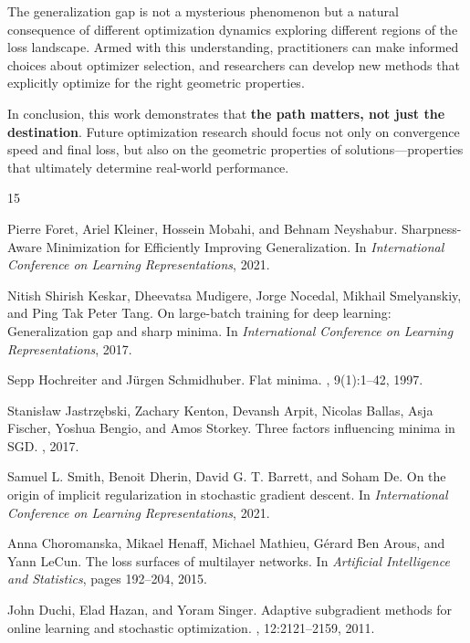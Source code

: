 \documentclass[12pt,a4paper]{article}
\begin{document}
The generalization gap is not a mysterious phenomenon but a natural consequence of different optimization dynamics exploring different regions of the loss landscape. Armed with this understanding, practitioners can make informed choices about optimizer selection, and researchers can develop new methods that explicitly optimize for the right geometric properties.

In conclusion, this work demonstrates that \textbf{the path matters, not just the destination}. Future optimization research should focus not only on convergence speed and final loss, but also on the geometric properties of solutions—properties that ultimately determine real-world performance.


\begin{thebibliography}{15}

Pierre Foret, Ariel Kleiner, Hossein Mobahi, and Behnam Neyshabur.
\newblock Sharpness-Aware Minimization for Efficiently Improving Generalization.
\newblock In {\em International Conference on Learning Representations}, 2021.

Nitish Shirish Keskar, Dheevatsa Mudigere, Jorge Nocedal, Mikhail Smelyanskiy, and Ping Tak Peter Tang.
\newblock On large-batch training for deep learning: Generalization gap and sharp minima.
\newblock In {\em International Conference on Learning Representations}, 2017.

Sepp Hochreiter and Jürgen Schmidhuber.
\newblock Flat minima.
, 9(1):1--42, 1997.

Stanisław Jastrzębski, Zachary Kenton, Devansh Arpit, Nicolas Ballas, Asja Fischer, Yoshua Bengio, and Amos Storkey.
\newblock Three factors influencing minima in SGD.
, 2017.

Samuel L. Smith, Benoit Dherin, David G. T. Barrett, and Soham De.
\newblock On the origin of implicit regularization in stochastic gradient descent.
\newblock In {\em International Conference on Learning Representations}, 2021.

Anna Choromanska, Mikael Henaff, Michael Mathieu, Gérard Ben Arous, and Yann LeCun.
\newblock The loss surfaces of multilayer networks.
\newblock In {\em Artificial Intelligence and Statistics}, pages 192--204, 2015.

John Duchi, Elad Hazan, and Yoram Singer.
\newblock Adaptive subgradient methods for online learning and stochastic optimization.
, 12:2121--2159, 2011.


\end{thebibliography}
\end{document}
